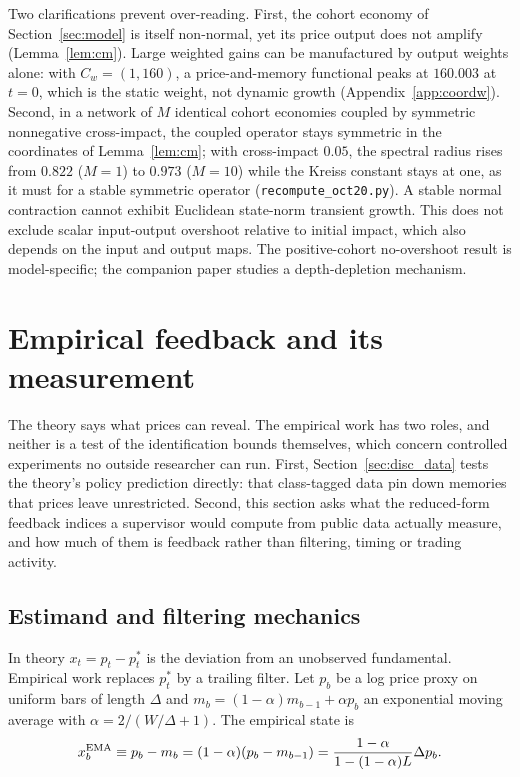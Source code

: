 \documentclass[12pt]{article}
\theoremstyle{definition}
\theoremstyle{remark}
\begin{document}
Two clarifications prevent over-reading. First, the cohort economy of Section~\ref{sec:model} is itself non-normal, yet its price output does not amplify (Lemma~\ref{lem:cm}). Large weighted gains can be manufactured by output weights alone: with $C_w=(1,160)$, a price-and-memory functional peaks at $160.003$ at $t=0$, which is the static weight, not dynamic growth (Appendix~\ref{app:coordw}). Second, in a network of $M$ identical cohort economies coupled by symmetric nonnegative cross-impact, the coupled operator stays symmetric in the coordinates of Lemma~\ref{lem:cm}; with cross-impact $0.05$, the spectral radius rises from $0.822$ ($M=1$) to $0.973$ ($M=10$) while the Kreiss constant stays at one, as it must for a stable symmetric operator (\texttt{recompute\_oct20.py}). A stable normal contraction cannot exhibit Euclidean state-norm transient growth. This does not exclude scalar input-output overshoot relative to initial impact, which also depends on the input and output maps. The positive-cohort no-overshoot result is model-specific; the companion paper studies a depth-depletion mechanism.
\section{Empirical feedback and its measurement}\label{sec:empirics}

The theory says what prices can reveal. The empirical work has two roles, and neither is a test of the identification bounds themselves, which concern controlled experiments no outside researcher can run. First, Section~\ref{sec:disc_data} tests the theory's policy prediction directly: that class-tagged data pin down memories that prices leave unrestricted. Second, this section asks what the reduced-form feedback indices a supervisor would compute from public data actually measure, and how much of them is feedback rather than filtering, timing or trading activity.

\subsection{Estimand and filtering mechanics}

In theory $x_t=p_t-p^*_t$ is the deviation from an unobserved fundamental. Empirical work replaces $p^*_t$ by a trailing filter. Let $p_b$ be a log price proxy on uniform bars of length $\Delta$ and $m_b=(1-\alpha)m_{b-1}+\alpha p_b$ an exponential moving average with $\alpha=2/(W/\Delta+1)$. The empirical state is
\begin{equation}\label{eq:ema}
x^{\rm EMA}_b\equiv p_b-m_b=(1-\alpha)(p_b-m_{b-1})=\frac{1-\alpha}{1-(1-\alpha)L}\Delta p_b .
\end{equation}
\end{document}
